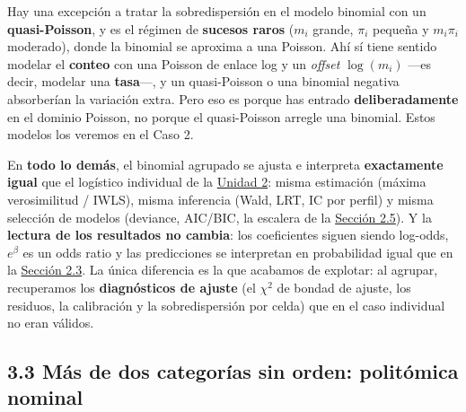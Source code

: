 \documentclass[
  letterpaper,
  DIV=11,
  numbers=noendperiod]{scrartcl}
\begin{document}
\begin{tcolorbox}[enhanced jigsaw, coltitle=black, rightrule=.15mm, arc=.35mm, leftrule=.75mm, colback=white, colbacktitle=quarto-callout-note-color!10!white, left=2mm, breakable, toptitle=1mm, toprule=.15mm, bottomtitle=1mm, titlerule=0mm, title=\textcolor{quarto-callout-note-color}{\faInfo}\hspace{0.5em}{¿Y tratar la sobredispersión binomial con quasi-Poisson?}, bottomrule=.15mm, opacityback=0, opacitybacktitle=0.6, colframe=quarto-callout-note-color-frame]

Hay una excepción a tratar la sobredispersión en el modelo binomial con
un \textbf{quasi-Poisson}, y es el régimen de \textbf{sucesos raros}
(\(m_i\) grande, \(\pi_i\) pequeña y \(m_i\pi_i\) moderado), donde la
binomial se aproxima a una Poisson. Ahí sí tiene sentido modelar el
\textbf{conteo} con una Poisson de enlace log y un \emph{offset}
\(\log(m_i)\) ---es decir, modelar una \textbf{tasa}---, y un
quasi-Poisson o una binomial negativa absorberían la variación extra.
Pero eso es porque has entrado \textbf{deliberadamente} en el dominio
Poisson, no porque el quasi-Poisson arregle una binomial. Estos modelos
los veremos en el Caso 2.

\end{tcolorbox}

En \textbf{todo lo demás}, el binomial agrupado se ajusta e interpreta
\textbf{exactamente igual} que el logístico individual de la
\protect\hyperlink{sec-u12}{Unidad 2}: misma estimación (máxima
verosimilitud / IWLS), misma inferencia (Wald, LRT, IC por perfil) y
misma selección de modelos (deviance, AIC/BIC, la escalera de la
\protect\hyperlink{sec-u12-inferencia}{Sección 2.5}). Y la
\textbf{lectura de los resultados no cambia}: los coeficientes siguen
siendo log-odds, \(e^{\beta}\) es un odds ratio y las predicciones se
interpretan en probabilidad igual que en la
\protect\hyperlink{sec-u12-interpretacion}{Sección 2.3}. La única
diferencia es la que acabamos de explotar: al agrupar, recuperamos los
\textbf{diagnósticos de ajuste} (el \(\chi^2\) de bondad de ajuste, los
residuos, la calibración y la sobredispersión por celda) que en el caso
individual no eran válidos.

\hypertarget{sec-u13-nominal}{%
\subsection{3.3 Más de dos categorías sin orden: politómica
nominal}\label{sec-u13-nominal}}
\end{document}
